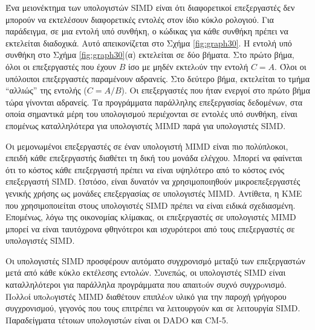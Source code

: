 \documentclass[12pt,a4paper]{article}
\begin{document}
Ένα μειονέκτημα των υπολογιστών \foreignlanguage{english}{SIMD} είναι ότι διαφορετικοί επεξεργαστές 
δεν μπορούν να εκτελέσουν διαφορετικές εντολές στον ίδιο κύκλο ρολογιού. 
Για παράδειγμα, σε μια εντολή υπό συνθήκη, ο κώδικας για κάθε συνθήκη 
πρέπει να εκτελείται διαδοχικά. Αυτό απεικονίζεται στο Σχήμα \ref{fig:graph30}. Η 
εντολή υπό συνθήκη στο Σχήμα \ref{fig:graph30}(α) εκτελείται σε δύο βήματα. Στο πρώτο 
βήμα, όλοι οι επεξεργαστές που έχουν \( B \) ίσο με μηδέν εκτελoύν την 
εντολή \( C = A \). Όλοι οι υπόλοιποι επεξεργαστές παραμένουν αδρανείς. 
Στο δεύτερο βήμα, εκτελείται το τμήμα ``αλλιώς'' της εντολής (\( C = A/B \)). 
Οι επεξεργαστές που ήταν ενεργοί στο πρώτο βήμα τώρα γίνονται αδρανείς. 
Τα προγράμματα παράλληλης επεξεργασίας δεδομένων, στα οποία σημαντικά 
μέρη του υπολογισμού περιέχονται σε εντολές υπό συνθήκη, είναι επομένως 
καταλληλότερα για υπολογιστές \foreignlanguage{english}{MIMD} παρά για υπολογιστές \foreignlanguage{english}{SIMD}.

Οι μεμονωμένοι επεξεργαστές σε έναν υπολογιστή \foreignlanguage{english}{MIMD} είναι πιο πολύπλοκοι, 
επειδή κάθε επεξεργαστής διαθέτει τη δική του μονάδα ελέγχου. Μπορεί να 
φαίνεται ότι το κόστος κάθε επεξεργαστή πρέπει να είναι υψηλότερο από 
το κόστος ενός επεξεργαστή \foreignlanguage{english}{SIMD}. Ωστόσο, είναι δυνατόν να χρησιμοποιηθούν 
μικροεπεξεργαστές γενικής χρήσης ως μονάδες επεξεργασίας σε υπολογιστές 
\foreignlanguage{english}{MIMD}. Αντίθετα, η ΚΜΕ που χρησιμοποιείται στους υπολογιστές \foreignlanguage{english}{SIMD} πρέπει 
να είναι ειδικά σχεδιασμένη. Επομένως, λόγω της οικονομίας κλίμακας, οι 
επεξεργαστές σε υπολογιστές \foreignlanguage{english}{MIMD} μπορεί να είναι ταυτόχρονα φθηνότεροι 
και ισχυρότεροι από τους επεξεργαστές σε υπολογιστές \foreignlanguage{english}{SIMD}.

Οι υπολογιστές \foreignlanguage{english}{SIMD} προσφέρουν αυτόματο συγχρονισμό μεταξύ των 
επεξεργαστών μετά από κάθε κύκλο εκτέλεσης εντολών. Συνεπώς, οι 
υπολογιστές \foreignlanguage{english}{SIMD} είναι καταλληλότεροι για παράλληλα προγράμματα που 
απαιτoύν συχνό συγχρoνισμό. Πoλλoί υπoλoγιστές \foreignlanguage{english}{MIMD} διαθέτουν επιπλέoν 
υλικό για την παροχή γρήγορου συγχρονισμού, γεγονός που τους επιτρέπει 
να λειτουργούν και σε λειτουργία \foreignlanguage{english}{SIMD}. Παραδείγματα τέτοιων υπολογιστών 
είναι οι \foreignlanguage{english}{DADO} και \foreignlanguage{english}{CM-5}.
\end{document}
